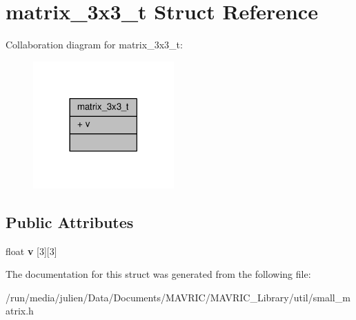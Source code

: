 \hypertarget{structmatrix__3x3__t}{\section{matrix\+\_\+3x3\+\_\+t Struct Reference}
\label{structmatrix__3x3__t}
}


Collaboration diagram for matrix\+\_\+3x3\+\_\+t\+:
\nopagebreak
\begin{figure}[H]
\begin{center}
\leavevmode
\includegraphics[width=153pt]{structmatrix__3x3__t__coll__graph}
\end{center}
\end{figure}
\subsection*{Public Attributes}
\begin{DoxyCompactItemize}
\item 
\hypertarget{structmatrix__3x3__t_aa4d79cf005da233617d31221fc44e079}{float {\bfseries v} \mbox{[}3\mbox{]}\mbox{[}3\mbox{]}}\label{structmatrix__3x3__t_aa4d79cf005da233617d31221fc44e079}

\end{DoxyCompactItemize}


The documentation for this struct was generated from the following file\+:\begin{DoxyCompactItemize}
\item 
/run/media/julien/\+Data/\+Documents/\+M\+A\+V\+R\+I\+C/\+M\+A\+V\+R\+I\+C\+\_\+\+Library/util/small\+\_\+matrix.\+h\end{DoxyCompactItemize}
